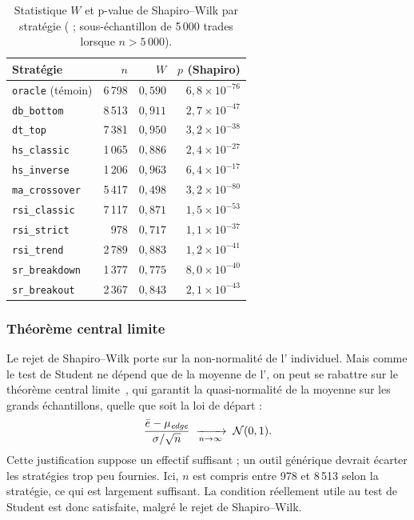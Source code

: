\begin{table}[H]
\centering
\caption{Statistique \(W\) et p-value de Shapiro--Wilk par stratégie
(\edgevar{} ; sous-échantillon de 5\,000 trades lorsque \(n > 5\,000\)).}
\label{tab:shapiro}
\small
\begin{tabular}{@{}lrrr@{}}
\toprule
Stratégie & $n$ & $W$ & $p$ (Shapiro) \\
\midrule
\texttt{oracle} (témoin) & 6\,798 & $0{,}590$ & $6{,}8\times10^{-76}$ \\
\midrule
\texttt{db\_bottom}    & 8\,513 & $0{,}911$ & $2{,}7\times10^{-47}$ \\
\texttt{dt\_top}       & 7\,381 & $0{,}950$ & $3{,}2\times10^{-38}$ \\
\texttt{hs\_classic}   & 1\,065 & $0{,}886$ & $2{,}4\times10^{-27}$ \\
\texttt{hs\_inverse}   & 1\,206 & $0{,}963$ & $6{,}4\times10^{-17}$ \\
\texttt{ma\_crossover} & 5\,417 & $0{,}498$ & $3{,}2\times10^{-80}$ \\
\texttt{rsi\_classic}  & 7\,117 & $0{,}871$ & $1{,}5\times10^{-53}$ \\
\texttt{rsi\_strict}   &   978  & $0{,}717$ & $1{,}1\times10^{-37}$ \\
\texttt{rsi\_trend}    & 2\,789 & $0{,}883$ & $1{,}2\times10^{-41}$ \\
\texttt{sr\_breakdown} & 1\,377 & $0{,}775$ & $8{,}0\times10^{-40}$ \\
\texttt{sr\_breakout}  & 2\,367 & $0{,}843$ & $2{,}1\times10^{-43}$ \\
\bottomrule
\end{tabular}
\end{table}

\subsubsection*{Théorème central limite}
Le rejet de Shapiro--Wilk porte sur la non-normalité de l'\edgevar{}
individuel. Mais comme le test de Student ne dépend que de la
moyenne de l'\edgevar{}, on peut se rabattre sur le théorème central
limite~\cite{saporta2006}, qui garantit la quasi-normalité de la moyenne sur
les grands échantillons, quelle que soit la loi de départ :
\[
  \frac{\bar e - \mu_{\textit{edge}}}{\sigma/\sqrt{n}}
  \;\xrightarrow[n \to \infty]{}\; \mathcal{N}(0,1) .
\]
Cette justification suppose un effectif suffisant ;
un outil générique devrait écarter les stratégies trop peu fournies.
Ici, \(n\) est compris entre 978 et 8\,513 selon la stratégie, ce qui est
largement suffisant.
La condition réellement utile au test de Student est donc satisfaite,
malgré le rejet de Shapiro--Wilk.

